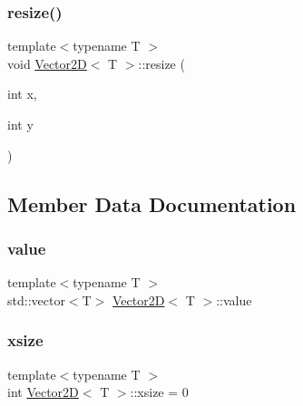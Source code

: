 \mbox{\label{struct_vector2_d_a686acefeb363d68e106fb4a951069a85}} 
\subsubsection{\texorpdfstring{resize()}{resize()}}
{\footnotesize\ttfamily template$<$typename T $>$ \\
void \hyperlink{struct_vector2_d}{Vector2D}$<$ T $>$\+::resize (\begin{DoxyParamCaption}\item[{int}]{x,  }\item[{int}]{y }\end{DoxyParamCaption})\hspace{0.3cm}{\ttfamily [inline]}}



\subsection{Member Data Documentation}
\mbox{\label{struct_vector2_d_a6c97eca85f7330f9773a248bbd268b7d}} 
\subsubsection{\texorpdfstring{value}{value}}
{\footnotesize\ttfamily template$<$typename T $>$ \\
std\+::vector$<$T$>$ \hyperlink{struct_vector2_d}{Vector2D}$<$ T $>$\+::value}

\mbox{\label{struct_vector2_d_a2183b46128acb0a2abc12242a2d08d3c}} 
\subsubsection{\texorpdfstring{xsize}{xsize}}
{\footnotesize\ttfamily template$<$typename T $>$ \\
int \hyperlink{struct_vector2_d}{Vector2D}$<$ T $>$\+::xsize = 0}

\mbox{\label{struct_vector2_d_a76a4280e708834f08e6f294f9171c6f3}} 
